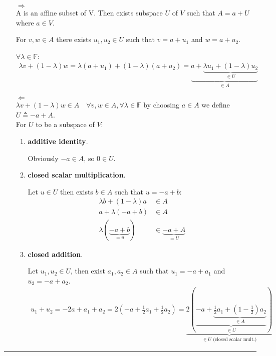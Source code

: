 \documentclass[12pt, letterpaper]{scrartcl}
\newcommand{\F}{\mathbb{F}}
\begin{document}
\begin{itemize}
    \item[$\Longrightarrow$]\mbox{}\\
    A is an affine subset of V. Then exists subspace $U$ of $V$ such that $A=a+U$ where $a\in V$.

    For $v,w\in A$ there exists $u_1,u_2\in U$ such that $v=a+u_1$ and $w=a+u_2$.

    $\forall \lambda \in \F$:
    \begin{align*}
        \lambda v+(1-\lambda)w=\lambda(a+u_1)+(1-\lambda)(a+u_2)=\underbrace{a+\underbrace{\lambda u_1+(1-\lambda)u_2}_{\in U}}_{\in A}
    \end{align*}
    
    \item[$\Longleftarrow$]\mbox{}\\
    $\lambda v+(1-\lambda)w\in A \quad \forall v,w\in A , \forall\lambda\in\F$ by choosing $a\in A$ we define $U\triangleq-a+A$.\\
    
    For $U$ to be a subspace of $V$:
    \begin{enumerate}
        \item \textbf{additive identity}. 
        
        Obviously $-a\in A$, so $0\in U$.
        
        \item \textbf{closed scalar multiplication}.

        Let $u\in U$ then exists $b\in A$ such that $u=-a+b$:
        \begin{align*}
            \lambda b + (1-\lambda)a &\in A\\
            a + \lambda(-a+b)
            &\in A\\
            \lambda(\underbrace{-a+b}_{=u})&\in \underbrace{-a+A}_{= U}
        \end{align*}
        
        \item \textbf{closed addition}.
        
        Let $u_1, u_2\in U$, then exist $a_1, a_2\in A$ such that $u_1=-a+a_1$ and $u_2=-a+a_2$.
        \begin{align*}
            u_1+u_2=-2a+a_1+a_2=2(-a+\frac{1}{2}a_1+\frac{1}{2}a_2)=\underbrace{2(\underbrace{-a+\underbrace{\frac{1}{2}a_1+(1-\frac{1}{2})a_2}_{\in A}}_{\in U})}_{\in U \text{  (closed scalar mult.)}}
        \end{align*}
        
    \end{enumerate}
    
\end{itemize}
\vskip1mm\hrule
\end{document}
